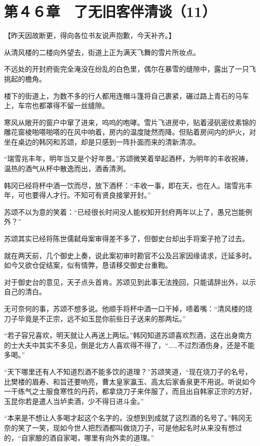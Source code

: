 \section{第４６章　了无旧客伴清谈（11）}

【昨天因故断更，得向各位书友说声抱歉，今天补齐。】

从清风楼的二楼向外望去，街道上正为满天飞舞的雪片所妆点。

不远处的开封府衙完全淹没在纷乱的白色里，偶尔在暴雪的缝隙中，露出了一只飞挑起的檐角。

楼下的街道上，为数不多的行人都用连帽斗篷将自己裹紧，碾过路上青石的马车上，车帘也都罩得不留一丝缝隙。

寒风从敞开的窗户中窜了进来，呜呜的咆哮。雪片飞进房中，贴着浸矾密纹素锦的雕花窗棱啪嗒啪嗒的在风中响着，房内的温度陡然而降。但贴着房间内的炉火，对坐在桌边的韩冈和苏颂，却是只感到一阵扑面而来的清新清凉。

“瑞雪兆丰年，明年当又是个好年景。”苏颂微笑着举起酒杯，为明年的丰收祝祷，温热的酒气从杯中散逸而出，酒香清洌。

韩冈已经将杯中酒一饮而尽，放下酒杯：“丰收一事，即在天，也在人。瑞雪兆丰年，可也要得人才行。不知可有贤良接掌开封。”

苏颂不以为意的笑着：“已经很长时间没人能权知开封府两年以上了，愚兄岂能例外？”

苏颂其实已经将陈世儒弑母案审得差不多了，但御史台却出手将案子抢了过去。

就在两天前，几个御史上奏，说此案初审时勘官不公及吕家因缘请求，迁延多时。如今又欲仓促结案，似有情弊，恳请移交御史台重鞫。

对于御史台的意见，天子点头首肯。苏颂见到此事无法挽回，只能请辞出外，以示自己的清白。

无可奈何的事，苏颂不想多说。他顺手将杯中酒一口干掉，啧着嘴：“清风楼的烧刀子毕竟是不正宗，远不如玉昆你前些日子送来的那两坛。”

“若子容兄喜欢，明天就让人再送上两坛。”韩冈知道苏颂喜欢烈酒，这在出身南方的士大夫中其实不多见，倒是北方人喜欢得不得了，“……不过烈酒伤身，还是不能多喝。”

“天下哪里还有人不知道烈酒不能多饮的道理？”苏颂笑道，“现在烧刀子的名号，比樊楼的眉寿、和旨还要响亮，曹太皇家瀛玉、高太后家香泉更不用说。听说如今一干练气之士服食寒性的丹药，都拿烧刀子来伴服了，而且出自韩家正宗的方好，玉昆你若是遣人当垆卖酒，少不得日进斗金。”

“本来是不想让人多喝才起这个名字的，没想到到成就了这烈酒的名号了。”韩冈无奈的笑了一笑，现如今世人把烈酒都叫做烧刀子，可是他起名时从来没有想过的，“自家酿的酒自家喝，哪里有向外卖的道理。”

